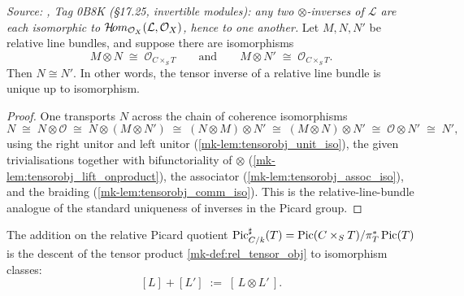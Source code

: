 \begin{lemma}\label{mk-lem:rel_pic_sharp_inverse_unique}

  \textit{Source: \cite{stacks-project}, Tag 0B8K (\S 17.25, invertible modules): any
  two \(\otimes\)-inverses of \(\mathcal{L}\) are each isomorphic to
  \(\mathcal{H}\!om_{\mathcal{O}_X}(\mathcal{L}, \mathcal{O}_X)\), hence to one
  another.}
  Let \(M, N, N'\) be relative line bundles, and suppose there are
  isomorphisms
  \[
    M \otimes N \;\cong\; \mathcal{O}_{C \times_S T}
    \qquad\text{and}\qquad
    M \otimes N' \;\cong\; \mathcal{O}_{C \times_S T}.
  \]
  Then \(N \cong N'\). In other words, the tensor inverse of a relative line
  bundle is unique up to isomorphism.
\end{lemma}

\begin{proof}
 One transports \(N\) across the chain of coherence
  isomorphisms
  \[
    N \;\cong\; N \otimes \mathcal{O}
      \;\cong\; N \otimes (M \otimes N')
      \;\cong\; (N \otimes M) \otimes N'
      \;\cong\; (M \otimes N) \otimes N'
      \;\cong\; \mathcal{O} \otimes N'
      \;\cong\; N',
  \]
  using the right unitor and left unitor (\ref{mk-lem:tensorobj_unit_iso}), the
  given trivialisations together with bifunctoriality of \(\otimes\)
  (\ref{mk-lem:tensorobj_lift_onproduct}), the associator
  (\ref{mk-lem:tensorobj_assoc_iso}), and the braiding
  (\ref{mk-lem:tensorobj_comm_iso}). This is the relative-line-bundle analogue of
  the standard uniqueness of inverses in the Picard group.
\end{proof}

\begin{definition}\label{mk-def:rel_add}
  \leanok

  The addition on the relative Picard quotient
  \(\operatorname{Pic}^\sharp_{C/k}(T) = \operatorname{Pic}(C \times_S T)/\pi_T^*\operatorname{Pic}(T)\) is the descent of
  the tensor product \ref{mk-def:rel_tensor_obj} to isomorphism classes:
  \[
    [L] + [L'] \;:=\; [\,L \otimes L'\,].
  \]
\end{definition}

